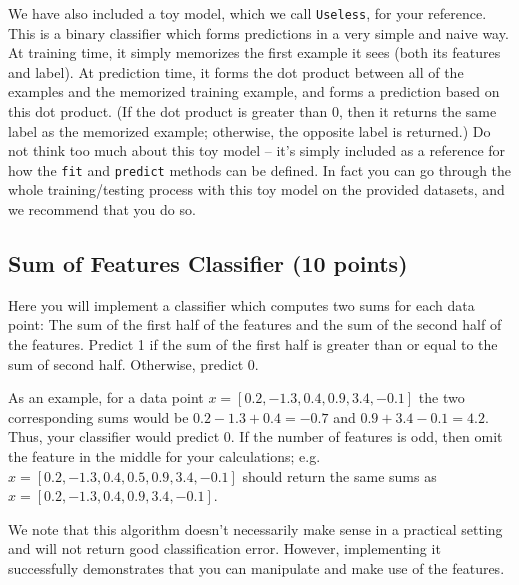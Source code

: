 \documentclass[11pt]{article}
\begin{document}
	We have also included a toy model, which we call \texttt{Useless}, for your reference. This is a binary classifier which forms predictions in a very simple and naive way. At training time, it simply memorizes the first example it sees (both its features and label). At prediction time, it forms the dot product between all of the examples and the memorized training example, and forms a prediction based on this dot product. (If the dot product is greater than 0, then it returns the same label as the memorized example; otherwise, the opposite label is returned.) Do not think too much about this toy model -- it's simply included as a reference for how the \texttt{fit} and \texttt{predict} methods can be defined. In fact you can go through the whole training/testing process with this toy model on the provided datasets, and we recommend that you do so.
	
	\subsection{Sum of Features Classifier (10 points)}
	Here you will implement a classifier which computes two sums for each data point: The sum of the first half of the features and the sum of the second half of the features. Predict 1 if the sum of the first half is greater than or equal to the sum of second half. Otherwise, predict 0.
	
	As an example, for a data point $x = [0.2, -1.3, 0.4, 0.9, 3.4, -0.1]$  the two corresponding sums would be $0.2 - 1.3 + 0.4 = -0.7$ and $0.9 + 3.4 - 0.1 = 4.2$. Thus, your classifier would predict 0. If the number of features is odd, then omit the feature in the middle for your calculations; e.g. $x = [0.2, -1.3, 0.4, 0.5, 0.9, 3.4, -0.1]$ should return the same sums as $x = [0.2, -1.3, 0.4, 0.9, 3.4, -0.1]$.
	
	We note that this algorithm doesn't necessarily make sense in a practical setting and will not return good classification error. However, implementing it successfully demonstrates that you can manipulate and make use of the features.
	
\end{document}
